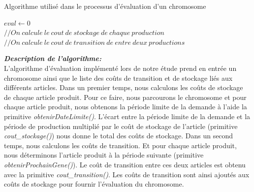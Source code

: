 	\begin{algorithm}[H]
 		\caption{Algorithme utilisé dans le processus d'évaluation d'un chromosome}
 		\label{alg:evaluation}
 		\BlankLine
 		$eval \gets 0$\\
 		$// On\ calcule\ le\ cout\ de\ stockage\ de\ chaque\ production$ \\
 		$// On\ calcule\ le\ cout\ de\ transition\ de\ entre\ deux\ productions$ \\
	\end{algorithm}
	
	\vspace*{.3cm}
	\hspace*{.5cm} \textbf{\textsl{Description de l'algorithme:}}\\	
	\hspace*{.5cm} L'algorithme d'évaluation implémenté lors de notre étude prend en entrée un chromosome ainsi que le liste des coûts de transition et de stockage liés aux différents articles.
	Dans un premier temps, nous calculons les coûts de stockage de chaque article produit. Pour ce faire, nous parcourons le chromosome et pour chaque article produit, nous obtenons la période limite de la demande à l'aide la primitive \emph{obtenirDateLimite()}. L'écart entre la période limite de la demande et la  période de production multiplié par le coût de stockage de l'article (primitive \emph{cout\_stockage()}) nous donne le total des coûts de stockage. Dans un second temps, nous calculons les coûts de transition. Et pour chaque article produit, nous déterminons l'article produit à la période suivante (primitive \emph{obtenirProchainGene()}). Le coût de transition entre ces deux articles est obtenu avec la primitive \emph{cout\_transition()}. Les coûts de transition sont ainsi ajoutés aux coûts de stockage pour fournir l'évaluation du chromosome. 
	
